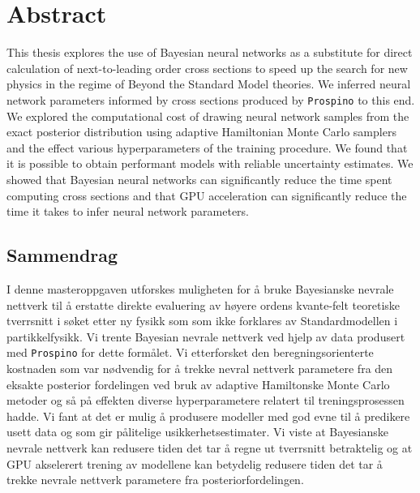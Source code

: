 \chapter*{Abstract}
This thesis explores the use of Bayesian neural networks as a substitute for direct calculation of next-to-leading order cross sections to speed up the search for new physics in the regime of Beyond the Standard Model theories.
We inferred neural network parameters informed by cross sections produced by {\tt Prospino} to this end.
We explored the computational cost of drawing neural network samples from the exact posterior distribution using adaptive Hamiltonian Monte Carlo samplers and the effect various hyperparameters of the training procedure. We found that it is possible to obtain performant models with reliable uncertainty estimates. We showed that Bayesian neural networks can significantly reduce the time spent computing cross sections and that GPU acceleration can significantly reduce the time it takes to infer neural network parameters.


\section*{Sammendrag}
I denne masteroppgaven utforskes muligheten for å bruke Bayesianske nevrale nettverk til å erstatte direkte evaluering av høyere ordens kvante-felt teoretiske tverrsnitt i søket etter ny fysikk som som ikke forklares av Standardmodellen i partikkelfysikk. 
Vi trente Bayesian nevrale nettverk ved hjelp av data produsert med {\tt Prospino} for dette formålet. 
Vi etterforsket den beregningsorienterte kostnaden som var nødvendig for å trekke nevral nettverk parametere fra den eksakte posterior fordelingen ved bruk av adaptive Hamiltonske Monte Carlo metoder og så på effekten diverse hyperparametere relatert til treningsprosessen hadde. Vi fant at det er mulig å produsere modeller med god evne til å predikere usett data og som gir pålitelige usikkerhetsestimater. Vi viste at Bayesianske nevrale nettverk kan redusere tiden det tar å regne ut tverrsnitt betraktelig og at GPU akselerert trening av modellene kan betydelig redusere tiden det tar å trekke nevrale nettverk parametere fra posteriorfordelingen.